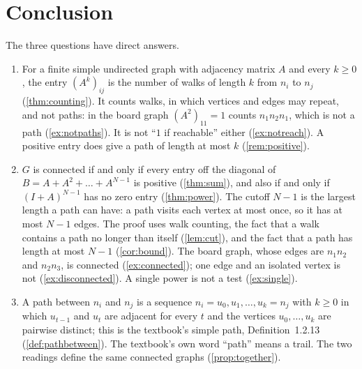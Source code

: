 \section{Conclusion}\label{sec:conclusion}

The three questions have direct answers.

\begin{enumerate}
\item[(Q1)] For a finite simple undirected graph with adjacency matrix $A$
  and every $k\ge 0$, the entry $(A^k)_{ij}$ is the number of walks of
  length $k$ from $n_i$ to $n_j$ (\cref{thm:counting}). It counts walks,
  in which vertices and edges may repeat, and not paths: in the board graph
  $(A^2)_{11}=1$ counts $n_1n_2n_1$, which is not a path
  (\cref{ex:notpaths}). It is not ``$1$ if reachable'' either
  (\cref{ex:notreach}). A positive entry does give a path of length at
  most $k$ (\cref{rem:positive}).
\item[(Q2)] $G$ is connected if and only if every entry off the diagonal of
  $B=A+A^2+\dots+A^{N-1}$ is positive (\cref{thm:sum}), and also if and
  only if $(I+A)^{N-1}$ has no zero entry (\cref{thm:power}). The cutoff $N-1$ is the
  largest length a path can have: a path visits each vertex at most once,
  so it has at most $N-1$ edges. The proof uses
  walk counting, the fact that a walk contains a path no longer than
  itself (\cref{lem:cut}), and the fact that a path has length at most
  $N-1$ (\cref{cor:bound}). The board graph, whose edges are $n_1n_2$ and
  $n_2n_3$, is connected (\cref{ex:connected}); one edge and an isolated
  vertex is not (\cref{ex:disconnected}). A single power is not a test
  (\cref{ex:single}).
\item[(Q3)] A path between $n_i$ and $n_j$ is a sequence
  $n_i=u_0,u_1,\dots,u_k=n_j$ with $k\ge 0$ in which $u_{t-1}$ and $u_t$ are
  adjacent for every $t$ and the vertices $u_0,\dots,u_k$ are pairwise
  distinct; this is the textbook's simple path, Definition~1.2.13
  (\cref{def:pathbetween}). The textbook's own word ``path'' means a trail.
  The two readings define the same connected graphs
  (\cref{prop:together}).
\end{enumerate}

